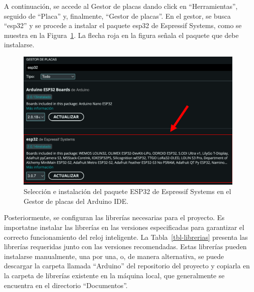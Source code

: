 \documentclass[
  12pt,
  letterpaper,
  DIV=11,
  numbers=noendperiod]{scrreport}
\begin{document}
A continuación, se accede al Gestor de placas dando click en
``Herramientas'', seguido de ``Placa'' y, finalmente, ``Gestor de
placas''. En el gestor, se busca ``esp32'' y se procede a instalar el
paquete esp32 de Espressif Systems, como se muestra en la
Figura~\ref{fig-esp32placas}. La flecha roja en la figura señala el
paquete que debe instalarse.

\begin{figure}

{\centering \includegraphics{Capitulos/../Imagenes/esp32_placas.png}

}

\caption{\label{fig-esp32placas}Selección e instalación del paquete
ESP32 de Espressif Systems en el Gestor de placas del Arduino IDE.}

\end{figure}

Posteriormente, se configuran las librerías necesarias para el proyecto.
Es importatne instalar las librerías en las versiones especificadas para
garantizar el correcto funcionamiento del reloj inteligente. La
Tabla~\ref{tbl-librerias} presenta las librerías requeridas junto con
las versiones recomendadas. Estas librerías pueden instalarse
manualmente, una por una, o, de manera alternativa, se puede descargar
la carpeta llamada ``Arduino'' del repositorio del proyecto y copiarla
en la carpeta de librerías existente en la máquina local, que
generalmente se encuentra en el directorio ``Documentos''.
\end{document}
